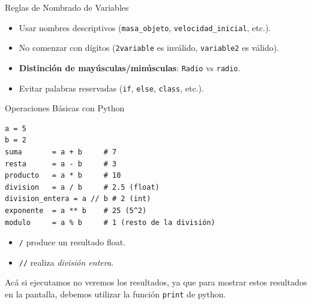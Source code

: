 \documentclass[10pt]{beamer}
\begin{document}
\begin{frame}{Reglas de Nombrado de Variables}
  \begin{itemize}
    \item Usar nombres descriptivos (\texttt{masa\_objeto}, \texttt{velocidad\_inicial}, etc.).
    \item No comenzar con dígitos (\texttt{2variable} es inválido, \texttt{variable2} es válido).
    \item \textbf{Distinción de mayúsculas/minúsculas}: \texttt{Radio} vs \texttt{radio}.
    \item Evitar palabras reservadas (\texttt{if}, \texttt{else}, \texttt{class}, etc.).
  \end{itemize}
\end{frame}

\begin{frame}[fragile]{Operaciones Básicas con Python}

\begin{verbatim}
a = 5
b = 2
suma       = a + b     # 7
resta      = a - b     # 3
producto   = a * b     # 10
division   = a / b     # 2.5 (float)
division_entera = a // b # 2 (int)
exponente  = a ** b    # 25 (5^2)
modulo     = a % b     # 1 (resto de la división)
\end{verbatim}

\begin{itemize}
  \item \texttt{/} produce un resultado float.
  \item \texttt{//} realiza \emph{división entera}.
\end{itemize}

Acá si ejecutamos no veremos los resultados, ya que para mostrar estos resultados en la pantalla, debemos utilizar la función \texttt{print} de python.
\end{frame}
\end{document}
